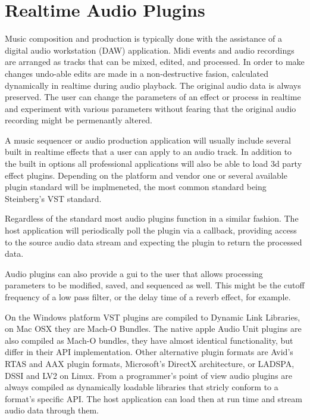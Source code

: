 \section{Realtime Audio Plugins}

Music composition and production is typically done with the assistance of a digital audio workstation (DAW) application. Midi events and audio recordings are arranged as tracks that can be mixed, edited, and processed. In order to make changes undo-able edits are made in a non-destructive fasion, calculated dynamically in realtime during audio playback. The original audio data is always preserved. The user can change the parameters of an effect or process in realtime and experiment with various parameters without fearing that the original audio recording might be permenantly altered.

A music sequencer or audio production application will usually include several built in realtime effects that a user can apply to an audio track. In addition to the built in options all professional applications will also be able to load 3d party effect plugins. Depending on the platform and vendor one or several available plugin standard will be implmeneted, the most common standard being Steinberg's VST standard.

Regardless of the standard most audio plugins function in a similar fashion. The host application will periodically poll the plugin via a callback, providing access to the source audio data stream and expecting the plugin to return the processed data.

Audio plugins can also provide a gui to the user that allows processing parameters to be modified, saved, and sequenced as well. This might be the cutoff frequency of a low pass filter, or the delay time of a reverb effect, for example.

On the Windows platform VST plugins are compiled to Dynamic Link Libraries, on Mac OSX they are Mach-O Bundles. The native apple Audio Unit plugins are also compiled as Mach-O bundles, they have almost identical functionality, but differ in their API implementation. Other alternative plugin formats are Avid's RTAS and AAX plugin formats, Microsoft's DirectX architecture, or LADSPA, DSSI and LV2 on Linux. From a programmer's point of view audio plugins are always compiled as dynamically loadable libraries that stricly conform to a format's specific API. The host application can load then at run time and stream audio data through them\cite{realtime-architectures}.

